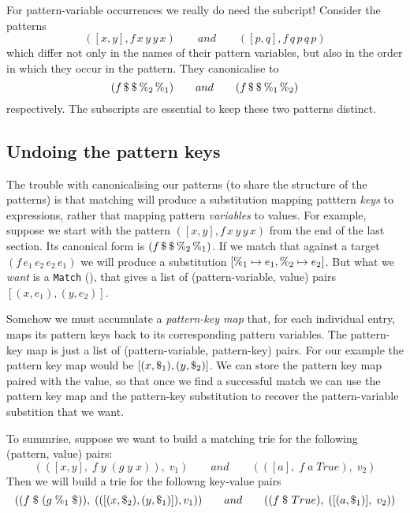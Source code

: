 \documentclass[acmsmall]{acmart}
\theoremstyle{theorem}
\theoremstyle{definition}
\theoremstyle{remark}
\begin{document}
For pattern-variable occurrences we really do need the subcript! Consider the
patterns $$([x,y], f\,x\,y\,y\,x) \qquad and \qquad ([p,q], f\,q\,p\,q\,p)$$
which differ not only in the names of their pattern variables, but also in the
order in which they occur in the pattern.
They canonicalise to
$$(f \,\$_{}\, \$_{}\, \%_{2}\, \%_{1}) \qquad and  \qquad (f \,\$_{}\, \$_{}\, \%_{1}\, \%_{2})$$
respectively.  The subscripts are essential to keep these two patterns distinct.

\subsection{Undoing the pattern keys} \label{sec:patkeymap}

The trouble with canonicalising our patterns (to share the structure of the patterns)
is that matching will produce a substitution mapping patttern \emph{keys} to
expressions, rather that mapping pattern \emph{variables} to values.  For example,
suppose we start with the pattern $([x,y], f \,x\, y\, y\, x)$ from the
end of the last section. Its canonical form is $(f \,\$_{}\, \$_{}\, \%_{2}\, \%_{1})$.
If we match that against a target $(f\,e_1\,e_2\,e_2\,e_1)$ we will produce a substitution $[\%_{1} \mapsto e_1, \%_{2} \mapsto e_2]$.
But  what we \emph{want} is a \lstinline{Match} (),
that gives a list of (pattern-variable, value) pairs $[(x, e_1), (y,e_2)]$.

Somehow we must accumulate a \emph{pattern-key map} that, for each
individual entry, maps its pattern keys back to its corresponding
pattern variables.  The pattern-key map is just a list of (pattern-variable, pattern-key) pairs.
For our example the pattern key map would be
$[(x, \$_{1}), (y,\$_{2})]$.  We can store the pattern key
map paired with the value, so that once we find a successful match we can use the pattern
key map and the pattern-key substitution to recover the pattern-variable substition that we want.

To summrise, suppose we want to build a matching trie for the following (pattern, value) pairs:
$$
(([x,y],\; f\;y\;(g\;y\;x)),\; v_1) \qquad and \qquad (([a],\; f\;a\;True),\;v_2)
$$
Then we will build a trie for the followng key-value pairs
$$
( (f \;\$_{}\;(g\;\%_{1}\;\$_{})),\; (([(x,\$_{2}),(y,\$_{1})]), v_1) )
  \qquad and \qquad
( (f \;\$_{}\;True),\; ([(a,\$_{1})],\;v_2) )
$$
\end{document}
